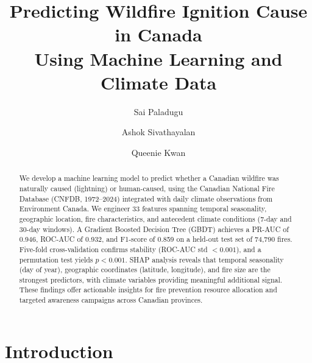 \documentclass[sigconf,nonacm]{acmart}
\begin{document}
\title{Predicting Wildfire Ignition Cause in Canada\\Using Machine Learning and Climate Data}

\author{Sai Paladugu}

\author{Ashok Sivathayalan}

\author{Queenie Kwan}

\begin{abstract}
We develop a machine learning model to predict whether a Canadian wildfire was naturally caused (lightning) or human-caused, using the Canadian National Fire Database (CNFDB, 1972--2024) integrated with daily climate observations from Environment Canada. We engineer 33 features spanning temporal seasonality, geographic location, fire characteristics, and antecedent climate conditions (7-day and 30-day windows). A Gradient Boosted Decision Tree (GBDT) achieves a PR-AUC of 0.946, ROC-AUC of 0.932, and F1-score of 0.859 on a held-out test set of 74,790 fires. Five-fold cross-validation confirms stability (ROC-AUC std $< 0.001$), and a permutation test yields $p < 0.001$. SHAP analysis reveals that temporal seasonality (day of year), geographic coordinates (latitude, longitude), and fire size are the strongest predictors, with climate variables providing meaningful additional signal. These findings offer actionable insights for fire prevention resource allocation and targeted awareness campaigns across Canadian provinces.
\end{abstract}

\maketitle

\section{Introduction}
\end{document}

